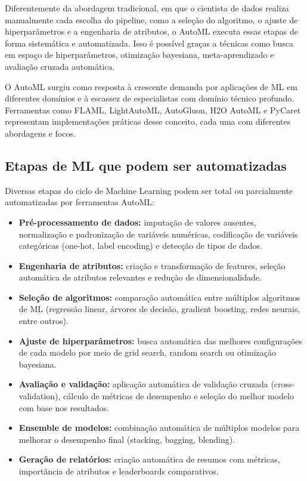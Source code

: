 \documentclass[11pt, a4paper, oneside]{article}
\begin{document}
Diferentemente da abordagem tradicional, em que o cientista de dados realiza
manualmente cada escolha do pipeline, como a seleção do algoritmo, o ajuste de
hiperparâmetros e a engenharia de atributos, o AutoML executa essas etapas de forma
sistemática e automatizada. Isso é possível graças a técnicas como busca em espaço de
hiperparâmetros, otimização bayesiana, meta-aprendizado e avaliação cruzada automática.

O AutoML surgiu como resposta à crescente demanda por aplicações de ML em diferentes
domínios e à escassez de especialistas com domínio técnico profundo. Ferramentas como
FLAML, LightAutoML, AutoGluon, H2O AutoML e PyCaret representam implementações
práticas desse conceito, cada uma com diferentes abordagens e focos.

\subsection{Etapas de ML que podem ser automatizadas}
\label{sec:etapas-automatizadas}

Diversas etapas do ciclo de Machine Learning podem ser total ou parcialmente
automatizadas por ferramentas AutoML:

\begin{itemize}[leftmargin=1.5cm, itemsep=4pt]
  \item \textbf{Pré-processamento de dados:} imputação de valores ausentes, normalização e padronização de variáveis numéricas, codificação de variáveis categóricas (one-hot, label encoding) e detecção de tipos de dados.
  \item \textbf{Engenharia de atributos:} criação e transformação de features, seleção automática de atributos relevantes e redução de dimensionalidade.
  \item \textbf{Seleção de algoritmos:} comparação automática entre múltiplos algoritmos de ML (regressão linear, árvores de decisão, gradient boosting, redes neurais, entre outros).
  \item \textbf{Ajuste de hiperparâmetros:} busca automática das melhores configurações de cada modelo por meio de grid search, random search ou otimização bayesiana.
  \item \textbf{Avaliação e validação:} aplicação automática de validação cruzada (cross-validation), cálculo de métricas de desempenho e seleção do melhor modelo com base nos resultados.
  \item \textbf{Ensemble de modelos:} combinação automática de múltiplos modelos para melhorar o desempenho final (stacking, bagging, blending).
  \item \textbf{Geração de relatórios:} criação automática de resumos com métricas, importância de atributos e leaderboards comparativos.
\end{itemize}
\end{document}
